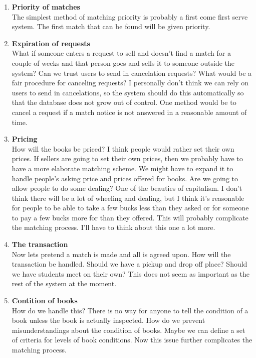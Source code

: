 \begin{enumerate}
\item {\bf Priority of matches}\\
The simplest method of matching priority is probably a first come
first serve system.  The first match that can be found will be given
priority.

\item  {\bf Expiration of requests}\\
What if someone enters a request to sell and doesn't find a match for
a couple of weeks and that person goes and sells it to someone outside
the system?  Can we trust users to send in cancelation requests?  What
would be a fair procedure for canceling requests?  I personally don't
think we can rely on users to send in cancelations, so the system
should do this automatically so that the database does not grow out of
control.  One method would be to cancel a request if a match notice is
not answered in a reasonable amount of time.

\item  {\bf Pricing}\\
How will the books be priced?  I think people would rather set their
own prices.  If sellers are going to set their own prices, then we
probably have to have a more elaborate matching scheme.  We might have
to expand it to handle people's asking price and prices offered for
books.  Are we going to allow people to do some dealing?  One of the
beauties of capitalism.  I don't think there will be a lot of wheeling
and dealing, but I think it's reasonable for people to be able to take
a few bucks less than they asked or for someone to pay a few bucks
more for than they offered.  This will probably complicate the
matching process.  I'll have to think about this one a lot more.


\item  {\bf The transaction}\\
Now lets pretend a match is made and all is agreed upon.  How will the
transaction be handled.  Should we have a pickup and drop off place?
Should we have students meet on their own?  This does not seem as
important as the rest of the system at the moment.


\item  {\bf Contition of books}\\
How do we handle this?  There is no way for anyone to tell the
condition of a book unless the book is actually inspected.  How do we
prevent misunderstandings about the condition of books.  Maybe we can
define a set of criteria for levels of book conditions.  Now this
issue further complicates the matching process.



\end{enumerate}
